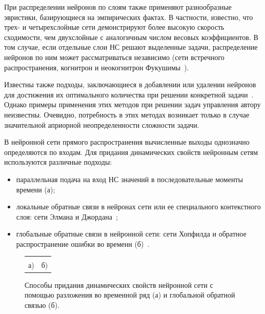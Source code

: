 При распределении нейронов по слоям также применяют разнообразные
эвристики, базирующиеся на эмпирических фактах.  В частности,
известно, что трех- и четырехслойные сети демонстрируют более высокую
скорость сходимости, чем двухслойные с аналогичным числом весовых
коэффициентов.  В том случае, если отдельные слои НС решают выделенные
задачи, распределение нейронов по ним может рассматриваться независимо
(сети встречного распространения, когнитрон и неокогнитрон
Фукушимы~\cite{wasser92}).

Известны также подходы, заключающиеся в добавлении или удалении
нейронов для достижения их оптимального количества при решении
конкретной задачи~\cite{gibb96}.  Однако примеры применения этих
методов при решении задач управления автору неизвестны.  Очевидно,
потребность в этих методах возникает только в случае значительной
априорной неопределенности сложности задачи.


В нейронной сети прямого распространения вычисленные выходы однозначно
определяются по входам.  Для придания динамических свойств нейронным
сетям используются различные подходы:

\begin{itemize}

\item
параллельная подача на вход НС значений в последовательные моменты
времени (а);

\item
локальные обратные связи в нейронах сети или ее специального
контекстного слоя: сети Элмана и Джордана~\cite{gibb96,golovko01};

\item
глобальные обратные связи в нейронной сети: сети Хопфилда и обратное
распространение ошибки во времени
(б)~\cite{wasser92,golovko01}.

\end{itemize}

\begin{figure}[h]
\centering
\begin{tabular}{cc}
\hbox{} &
\hbox{} \\
а) & б)\\
\end{tabular}
\caption{Способы придания динамических свойств нейронной сети с помощью
         разложения во временной ряд (а)
         и глобальной обратной связью (б).}
\label{fig:dynamic_nn}
\end{figure}

